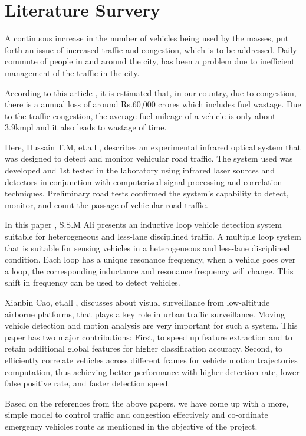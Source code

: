 \section{Literature Survery}
A continuous increase in the number of vehicles being used by the masses, put forth an issue of increased traffic and congestion, which is to be addressed. Daily commute of people in and around the city, has been a problem due to inefficient management of the traffic in the city.

According to this article \cite{trafficcongestion}, it is estimated that, in our country, due to congestion, there is a annual loss of around Rs.60,000 crores which includes fuel wastage. Due to the traffic congestion, the average fuel mileage of a vehicle is only about 3.9kmpl and it also leads to wastage of time.

Here, Hussain T.M, et.all \cite{infrared}, describes an experimental infrared optical system that was designed to detect and monitor vehicular road traffic. The system used was developed and 1st tested in the laboratory using infrared laser sources and detectors in conjunction with computerized signal processing and correlation techniques. Preliminary road tests confirmed the system's capability to detect, monitor, and count the passage of vehicular road traffic.

In this paper \cite{multiloop}, S.S.M Ali presents an inductive loop vehicle detection system suitable for heterogeneous and less-lane disciplined traffic. A multiple loop system that is suitable for sensing vehicles in a heterogeneous and less-lane disciplined condition. Each loop has a unique resonance frequency, when a vehicle goes over a loop, the corresponding inductance and resonance frequency will change. This shift in frequency can be used to detect vehicles.

Xianbin Cao, et.all \cite{lowaltitude}, discusses about visual surveillance from low-altitude airborne platforms, that plays a key role in urban traffic surveillance. Moving vehicle detection and motion analysis are very important for such a system. This paper has two major contributions: First, to speed up feature extraction and to retain additional global features for higher classification accuracy. Second, to efficiently correlate vehicles across different frames for vehicle motion trajectories computation, thus achieving better performance with higher detection rate, lower false positive rate, and faster detection speed.

Based on the references from the above papers, we have come up with a more, simple model to control traffic and congestion effectively and co-ordinate emergency vehicles route as mentioned in the objective of the project.
